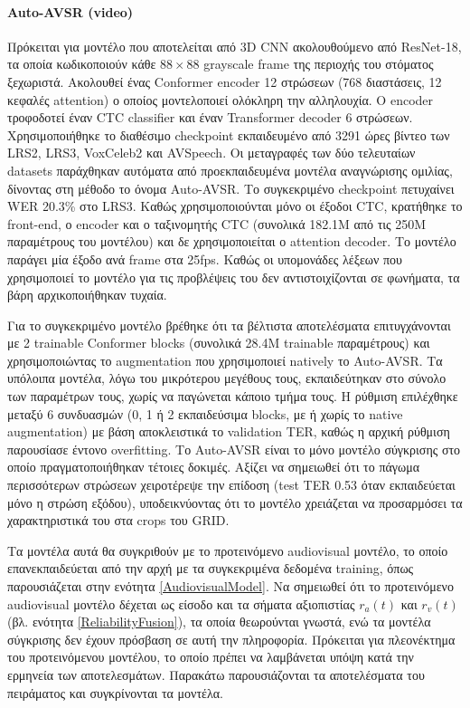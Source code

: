 \paragraph{Auto-AVSR (video) \cite{Ma_2023}} Πρόκειται για μοντέλο που αποτελείται από 3D CNN ακολουθούμενο από ResNet-18, τα οποία κωδικοποιούν κάθε $88\times88$ grayscale frame της περιοχής του στόματος ξεχωριστά. Ακολουθεί ένας Conformer encoder 12 στρώσεων (768 διαστάσεις, 12 κεφαλές attention) ο οποίος μοντελοποιεί ολόκληρη την αλληλουχία. Ο encoder τροφοδοτεί έναν CTC classifier και έναν Transformer decoder 6 στρώσεων. Χρησιμοποιήθηκε το διαθέσιμο checkpoint εκπαιδευμένο από 3291 ώρες βίντεο των LRS2, LRS3, VoxCeleb2 και AVSpeech. Οι μεταγραφές των δύο τελευταίων datasets παράχθηκαν αυτόματα από προεκπαιδευμένα μοντέλα αναγνώρισης ομιλίας, δίνοντας στη μέθοδο το όνομα Auto-AVSR. Το συγκεκριμένο checkpoint πετυχαίνει WER 20.3\% στο LRS3. Καθώς χρησιμοποιούνται μόνο οι έξοδοι CTC, κρατήθηκε το front-end, ο encoder και ο ταξινομητής CTC (συνολικά 182.1M από τις 250M παραμέτρους του μοντέλου) και δε χρησιμοποιείται ο attention decoder. Το μοντέλο παράγει μία έξοδο ανά frame στα 25fps. Καθώς οι υπομονάδες λέξεων που χρησιμοποιεί το μοντέλο για τις προβλέψεις του δεν αντιστοιχίζονται σε φωνήματα, τα βάρη αρχικοποιήθηκαν τυχαία. 

Για το συγκεκριμένο μοντέλο βρέθηκε ότι τα βέλτιστα αποτελέσματα επιτυγχάνονται με 2 trainable Conformer blocks (συνολικά 28.4M trainable παραμέτρους) και χρησιμοποιώντας το augmentation που χρησιμοποιεί natively το Auto-AVSR. Τα υπόλοιπα μοντέλα, λόγω του μικρότερου μεγέθους τους, εκπαιδεύτηκαν στο σύνολο των παραμέτρων τους, χωρίς να παγώνεται κάποιο τμήμα τους. Η ρύθμιση επιλέχθηκε μεταξύ 6 συνδυασμών (0, 1 ή 2 εκπαιδεύσιμα blocks, με ή χωρίς το native augmentation) με βάση αποκλειστικά το validation TER, καθώς η αρχική ρύθμιση παρουσίασε έντονο overfitting. Το Auto-AVSR είναι το μόνο μοντέλο σύγκρισης στο οποίο πραγματοποιήθηκαν τέτοιες δοκιμές. Αξίζει να σημειωθεί ότι το πάγωμα περισσότερων στρώσεων χειροτέρεψε την επίδοση (test TER 0.53 όταν εκπαιδεύεται μόνο η στρώση εξόδου), υποδεικνύοντας ότι το μοντέλο χρειάζεται να προσαρμόσει τα χαρακτηριστικά του στα crops του GRID.

Τα μοντέλα αυτά θα συγκριθούν με το προτεινόμενο audiovisual μοντέλο, το οποίο επανεκπαιδεύεται από την αρχή με τα συγκεκριμένα δεδομένα training, όπως παρουσιάζεται στην ενότητα \ref{AudiovisualModel}. Να σημειωθεί ότι το προτεινόμενο audiovisual μοντέλο δέχεται ως είσοδο και τα σήματα αξιοπιστίας $r_a(t)$ και $r_v(t)$ (βλ. ενότητα \ref{ReliabilityFusion}), τα οποία θεωρούνται γνωστά, ενώ τα μοντέλα σύγκρισης δεν έχουν πρόσβαση σε αυτή την πληροφορία. Πρόκειται για πλεονέκτημα του προτεινόμενου μοντέλου, το οποίο πρέπει να λαμβάνεται υπόψη κατά την ερμηνεία των αποτελεσμάτων. Παρακάτω παρουσιάζονται τα αποτελέσματα του πειράματος και συγκρίνονται τα μοντέλα.

